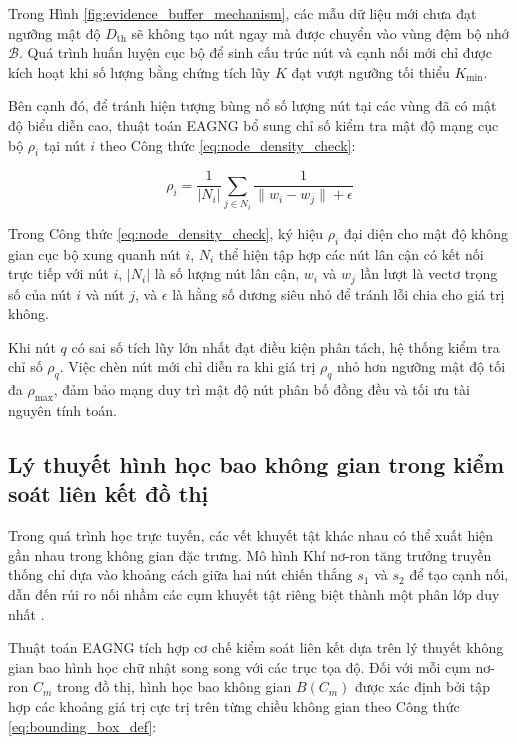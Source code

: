 Trong Hình \ref{fig:evidence_buffer_mechanism}, các mẫu dữ liệu mới chưa đạt ngưỡng mật độ $D_{\text{th}}$ sẽ không tạo nút ngay mà được chuyển vào vùng đệm bộ nhớ $\mathcal{B}$. Quá trình huấn luyện cục bộ để sinh cấu trúc nút và cạnh nối mới chỉ được kích hoạt khi số lượng bằng chứng tích lũy $K$ đạt vượt ngưỡng tối thiểu $K_{\text{min}}$.

Bên cạnh đó, để tránh hiện tượng bùng nổ số lượng nút tại các vùng đã có mật độ biểu diễn cao, thuật toán EAGNG bổ sung chỉ số kiểm tra mật độ mạng cục bộ $\rho_i$ tại nút $i$ theo Công thức \ref{eq:node_density_check}:

\begin{equation}
\rho_i = \frac{1}{|N_i|} \sum_{j \in N_i} \frac{1}{\|w_i - w_j\| + \epsilon}
\label{eq:node_density_check}
\end{equation}

Trong Công thức \ref{eq:node_density_check}, ký hiệu $\rho_i$ đại diện cho mật độ không gian cục bộ xung quanh nút $i$, $N_i$ thể hiện tập hợp các nút lân cận có kết nối trực tiếp với nút $i$, $|N_i|$ là số lượng nút lân cận, $w_i$ và $w_j$ lần lượt là vectơ trọng số của nút $i$ và nút $j$, và $\epsilon$ là hằng số dương siêu nhỏ để tránh lỗi chia cho giá trị không.

Khi nút $q$ có sai số tích lũy lớn nhất đạt điều kiện phân tách, hệ thống kiểm tra chỉ số $\rho_q$. Việc chèn nút mới chỉ diễn ra khi giá trị $\rho_q$ nhỏ hơn ngưỡng mật độ tối đa $\rho_{\text{max}}$, đảm bảo mạng duy trì mật độ nút phân bố đồng đều và tối ưu tài nguyên tính toán.

\subsection{Lý thuyết hình học bao không gian trong kiểm soát liên kết đồ thị}

Trong quá trình học trực tuyến, các vết khuyết tật khác nhau có thể xuất hiện gần nhau trong không gian đặc trưng. Mô hình Khí nơ-ron tăng trưởng truyền thống chỉ dựa vào khoảng cách giữa hai nút chiến thắng $s_1$ và $s_2$ để tạo cạnh nối, dẫn đến rủi ro nối nhầm các cụm khuyết tật riêng biệt thành một phân lớp duy nhất \cite{he2008graph}.

Thuật toán EAGNG tích hợp cơ chế kiểm soát liên kết dựa trên lý thuyết không gian bao hình học chữ nhật song song với các trục tọa độ. Đối với mỗi cụm nơ-ron $C_m$ trong đồ thị, hình học bao không gian $B(C_m)$ được xác định bởi tập hợp các khoảng giá trị cực trị trên từng chiều không gian theo Công thức \ref{eq:bounding_box_def}:

